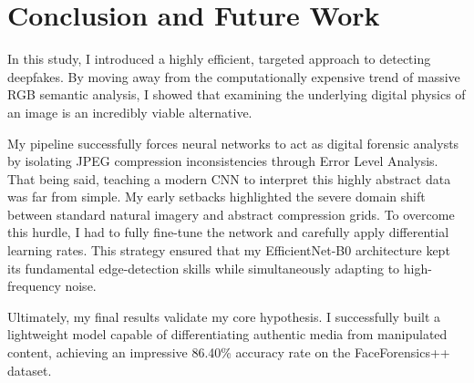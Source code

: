 \section{Conclusion and Future Work}
\label{sec:conclusion}

In this study, I introduced a highly efficient, targeted approach to detecting deepfakes. By moving away from the computationally expensive trend of massive RGB semantic analysis, I showed that examining the underlying digital physics of an image is an incredibly viable alternative.

My pipeline successfully forces neural networks to act as digital forensic analysts by isolating JPEG compression inconsistencies through Error Level Analysis. That being said, teaching a modern CNN to interpret this highly abstract data was far from simple. My early setbacks highlighted the severe domain shift between standard natural imagery and abstract compression grids. To overcome this hurdle, I had to fully fine-tune the network and carefully apply differential learning rates. This strategy ensured that my EfficientNet-B0 architecture kept its fundamental edge-detection skills while simultaneously adapting to high-frequency noise.

Ultimately, my final results validate my core hypothesis. I successfully built a lightweight model capable of differentiating authentic media from manipulated content, achieving an impressive 86.40\% accuracy rate on the FaceForensics++ dataset.
